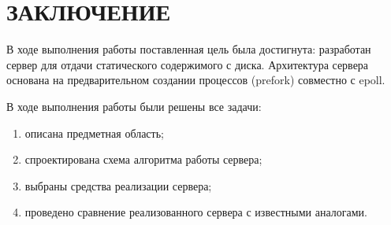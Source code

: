 \chapter*{ЗАКЛЮЧЕНИЕ}

В ходе выполнения работы поставленная цель была достигнута: 
разработан сервер для отдачи статического содержимого с диска.
Архитектура сервера основана на предварительном создании процессов (prefork) совместно с epoll.

В ходе выполнения работы были решены все задачи: 
\begin{enumerate}
	\item описана предметная область;
	\item спроектирована схема алгоритма работы сервера;
	\item выбраны средства реализации сервера;
	\item проведено сравнение реализованного сервера с известными аналогами.
\end{enumerate}